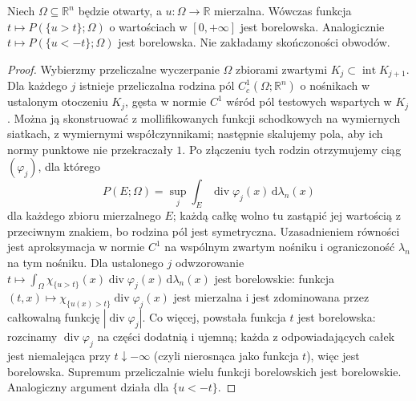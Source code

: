 \begin{lemat}
\label{lem:BV-level-meas-auditVI}
Niech $\Omega\subseteq\mathbb R^n$ będzie otwarty,
a $u:\Omega\to\mathbb R$ mierzalna. Wówczas funkcja
$t\mapsto P(\{u>t\};\Omega)$ o wartościach
w $[0,+\infty]$ jest borelowska. Analogicznie
$t\mapsto P(\{u<-t\};\Omega)$ jest borelowska.
Nie zakładamy skończoności obwodów.
\end{lemat}
\begin{proof}
Wybierzmy przeliczalne wyczerpanie $\Omega$
zbiorami zwartymi $K_j\subset\operatorname{int}K_{j+1}$.
Dla każdego $j$ istnieje przeliczalna rodzina
pól $C_c^1(\Omega;\mathbb R^n)$ o nośnikach
w ustalonym otoczeniu $K_j$, gęsta w normie $C^1$
wśród pól testowych wspartych w $K_j$.
Można ją skonstruować z mollifikowanych funkcji
schodkowych na wymiernych siatkach, z wymiernymi
współczynnikami; następnie skalujemy pola, aby
ich normy punktowe nie przekraczały $1$.
Po złączeniu tych rodzin otrzymujemy ciąg
$(\varphi_j)$, dla którego
\[
 P(E;\Omega)=\sup_j\int_E
 \operatorname{div}\varphi_j(x)\,\mathrm d\lambda_n(x)
\]
dla każdego zbioru mierzalnego $E$; każdą całkę
wolno tu zastąpić jej wartością z przeciwnym znakiem,
bo rodzina pól jest symetryczna. Uzasadnieniem
równości jest aproksymacja w normie $C^1$
na wspólnym zwartym nośniku i ograniczoność
$\lambda_n$ na tym nośniku.
Dla ustalonego $j$ odwzorowanie
$t\mapsto\int_\Omega\chi_{\{u>t\}}(x)
\operatorname{div}\varphi_j(x)\,\mathrm d\lambda_n(x)$
jest borelowskie: funkcja
$(t,x)\mapsto\chi_{\{u(x)>t\}}\operatorname{div}\varphi_j(x)$
jest mierzalna i jest zdominowana przez
całkowalną funkcję $|\operatorname{div}\varphi_j|$.
Co więcej, powstała funkcja $t$ jest borelowska:
rozcinamy $\operatorname{div}\varphi_j$ na części dodatnią
i ujemną; każda z odpowiadających całek jest
niemalejąca przy $t\downarrow-\infty$ (czyli
nierosnąca jako funkcja $t$), więc jest borelowska.
Supremum przeliczalnie wielu funkcji
borelowskich jest borelowskie. Analogiczny
argument działa dla $\{u<-t\}$.
\end{proof}

